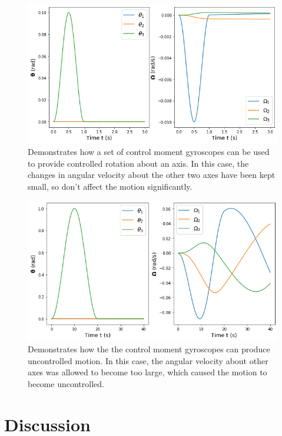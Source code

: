 \documentclass[12]{article}
\begin{document}
\begin{multicols*}{2}
\begin{figure}[H]
\centering
\includegraphics[width=\linewidth]{fig/cmg_controlled.png}
\vspace{-0.3cm}
\caption{\label{fig:cmg_controlled}Demonstrates how a set of control moment gyroscopes can be used to provide controlled rotation about an axis. In this case, the changes in angular velocity about the other two axes have been kept small, so don't affect the motion significantly. }
\end{figure}

\begin{figure}[H]
\centering
\includegraphics[width=\linewidth]{fig/cmg_uncontrolled.png}
\vspace{-0.3cm}
\caption{\label{fig:cmg_uncontrolled}Demonstrates how the the control moment gyroscopes can produce uncontrolled motion. In this case, the angular velocity about other axes was allowed to become too large, which caused the motion to become uncontrolled.}
\end{figure}

\vfill\null
\columnbreak

\section{Discussion}


\end{multicols*}
\end{document}
